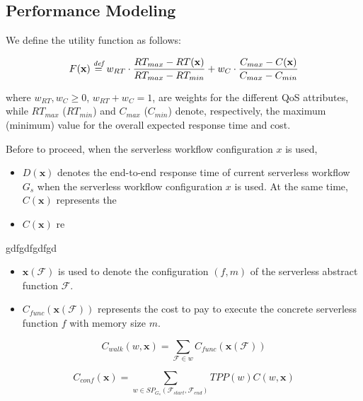 \subsection{Performance Modeling}






We define the utility function as follows:

\begin{equation}
	F(\textbf{x}) \overset{\textit{def}}{=} w_{RT} \cdot \dfrac{RT_{max} - RT(\textbf{x})}{RT_{max} - RT_{min}} + w_{C} \cdot \dfrac{C_{max} - C(\textbf{x})}{C_{max} - C_{min}}
\end{equation}

where $w_{RT}, w_{C} \geq 0$, $w_{RT} + w_{C} = 1$, are weights for the different QoS attributes, while $RT_{max}$ ($RT_{min}$) and $C_{max}$ ($C_{min}$) denote, respectively, the maximum (minimum) value for the overall expected response time and cost.






Before to proceed, when the serverless workflow configuration $x$ is used,




\begin{itemize}
	\item $D(\textbf{x})$ denotes the end-to-end response time of current serverless workflow $G_s$ when the serverless workflow configuration $x$ is used. At the same time, $C(\textbf{x})$ represents the  
	\item $C(\textbf{x})$ re
\end{itemize}

gdfgdfgdfgd

\begin{itemize}
	\item $\textbf{x}(\mathscr{F})$ is used to denote the configuration $\left( f, m \right) $ of the serverless abstract function $\mathscr{F}$.
	\item $C_{func}(\textbf{x}(\mathscr{F}))$ represents the cost to pay to execute the concrete serverless function $f$ with memory size $m$.
\end{itemize}



\begin{equation}
	C_{walk}(w, \textbf{x}) = \sum_{\mathscr{F} \in w} C_{func}(\textbf{x}(\mathscr{F}))
\end{equation}


\begin{equation}
	C_{conf}(\textbf{x}) = \sum_{w \in SP_{G_s}(\mathscr{F}_{start}, \mathscr{F}_{end})} TPP(w) C(w, \textbf{x})
\end{equation}


